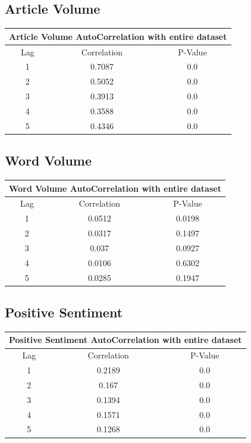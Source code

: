 \subsection{Article Volume}

\begin{center}
\begin{tabular}{ c c c }
\hline
\multicolumn{3}{|c|}{Article Volume AutoCorrelation with entire dataset} \\
\hline
Lag & Correlation & P-Value \\
\hline
1 & 0.7087 & 0.0 \\
2 & 0.5052 & 0.0 \\
3 & 0.3913 & 0.0 \\
4 & 0.3588 & 0.0 \\
5 & 0.4346 & 0.0 \\
\end{tabular}
\end{center}

\subsection{Word Volume}

\begin{center}
\begin{tabular}{ c c c }
\hline
\multicolumn{3}{|c|}{Word Volume AutoCorrelation with entire dataset} \\
\hline
Lag & Correlation & P-Value \\
\hline
1 & 0.0512 & 0.0198 \\
2 & 0.0317 & 0.1497 \\
3 & 0.037 & 0.0927 \\
4 & 0.0106 & 0.6302 \\
5 & 0.0285 & 0.1947 \\
\end{tabular}
\end{center}

\subsection{Positive Sentiment}

\begin{center}
\begin{tabular}{ c c c }
\hline
\multicolumn{3}{|c|}{Positive Sentiment AutoCorrelation with entire dataset} \\
\hline
Lag & Correlation & P-Value \\
\hline
1 & 0.2189 & 0.0 \\
2 & 0.167 & 0.0 \\
3 & 0.1394 & 0.0 \\
4 & 0.1571 & 0.0 \\
5 & 0.1268 & 0.0 \\
\end{tabular}
\end{center}

